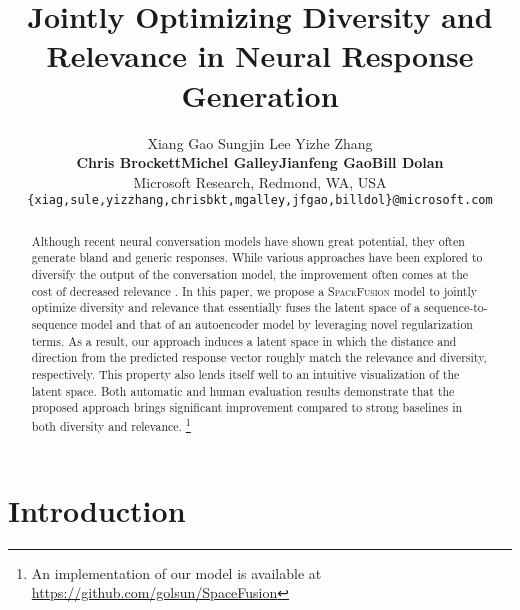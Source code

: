 \documentclass[11pt,a4paper]{article}
\title{Jointly Optimizing Diversity and Relevance in Neural Response Generation}
\author{Xiang Gao \quad\quad Sungjin Lee \quad\quad Yizhe Zhang   \\ \textbf{Chris Brockett}\quad\quad \textbf{Michel Galley}\quad\quad \textbf{Jianfeng Gao}\quad\quad \textbf{Bill Dolan}\\
  Microsoft Research, Redmond, WA, USA \\
  {\small \tt \{xiag,sule,yizzhang,chrisbkt,mgalley,jfgao,billdol\}@microsoft.com}
}
\date{}
\begin{document}
\maketitle
\begin{abstract}
Although recent neural conversation models have shown great potential, they often generate bland and generic responses. While various approaches have been explored to diversify the output of the conversation model, the improvement often comes at the cost of decreased relevance \cite{zhang2018gan}. 
In this paper, we propose a \textsc{SpaceFusion} model
to jointly optimize diversity and relevance that essentially fuses the latent space of a sequence-to-sequence model and that of an autoencoder model by leveraging novel regularization terms. As a result, our approach induces a latent space in which the distance and direction from the predicted response vector roughly match the relevance and diversity, respectively. This property also lends itself well to an intuitive visualization of the latent space. Both automatic and human evaluation results demonstrate that the proposed approach brings significant improvement compared to strong baselines in both diversity and relevance. \footnote{An implementation of our model is available at \url{https://github.com/golsun/SpaceFusion}}







  
\end{abstract}

\section{Introduction}
\label{sec:intro}
\label{sec:intro}
\end{document}
